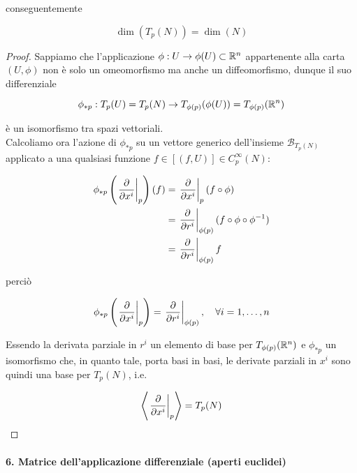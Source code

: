 conseguentemente

\begin{equation}
	\dim(T_{p}(N)) = \dim(N)
\end{equation}

\begin{proof}
	Sappiamo che l'applicazione $ \phi : U \to \phi(U) \subset \mathbb{R}^{n} $ appartenente alla carta $ (U,\phi) $ non è solo un omeomorfismo ma anche un diffeomorfismo, dunque il suo differenziale
	
	\begin{equation}
		\phi_{*p} : T_{p}(U) = T_{p}(N) \to T_{\phi(p)}(\phi(U)) = T_{\phi(p)}(\mathbb{R}^{n})
	\end{equation}

	è un isomorfismo tra spazi vettoriali.\\
	Calcoliamo ora l'azione di $ \phi_{*p} $ su un vettore generico dell'insieme $ \mathcal{B}_{T_{p}(N)} $ applicato a una qualsiasi funzione $ f \in [(f,U)] \in C_{p}^{\infty}(N) $:
	
	\begin{align}
		\begin{split}
			\phi_{*p} \left( \eval{ \pdv{x^{i}} }_{p} \right) (f) &= \eval{ \pdv{x^{i}} }_{p} (f \circ \phi)\\
			&= \eval{ \pdv{r^{i}} }_{\phi(p)} (f \circ \phi \circ \phi^{-1})\\
			&= \eval{ \pdv{r^{i}} }_{\phi(p)} f
		\end{split}
	\end{align}

	perciò
	
	\begin{equation}
		\phi_{*p} \left( \eval{ \pdv{x^{i}} }_{p} \right) = \eval{ \pdv{r^{i}} }_{\phi(p)} \qcomma \forall i=1,\dots,n
	\end{equation}

	Essendo la derivata parziale in $ r^{i} $ un elemento di base per $ T_{\phi(p)}(\mathbb{R}^{n}) $ e $ \phi_{*p} $ un isomorfismo che, in quanto tale, porta basi in basi, le derivate parziali in $ x^{i} $ sono quindi una base per $ T_{p}(N) $, i.e.
	
	\begin{equation}
		\expval{ \eval{ \pdv{x^{i}} }_{p} } = T_{p}(N)
	\end{equation}
\end{proof}

\paragraph{6. Matrice dell'applicazione differenziale (aperti euclidei)}

